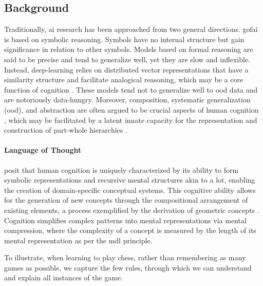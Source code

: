 \subsection{Background}
Traditionally, \acrfull{ai} research has been approached from two general directions. \acrfull{gofai} is based on symbolic reasoning. Symbols have no internal structure but gain significance in relation to other symbols. Models based on formal reasoning are said to be precise and tend to generalize well, yet they are slow and inflexible. Instead, deep-learning relies on distributed vector representations that have a similarity structure and facilitate analogical reasoning, which may be a core function of cognition \cite{bengio2021deep,hofstadter2013surfaces}. These models tend not to generalize well to \acrfull{ood} data and are notoriously data-hungry.
Moreover, composition, systematic generalization (\acrshort{ood}), and abstraction are often argued to be crucial aspects of human cognition \cite{cholletMeasureIntelligence2019, lecun2022path,Fodor_Pylyshyn_1988, hofstadter2013surfaces, boicho2001analogical}, which may be facilitated by a latent innate capacity for the representation and construction of part-whole hierarchies 
\cite{berwickPovertyStimulusRevisited2011,fristonWorldModelLearning2021,hintonHowRepresentPartwhole2021,martinsHowChildrenPerceive2014,raussWhatBottomUpWhat2013,schwartzBehavioralNeuralConstraints2017}.

\paragraph*{Language of Thought}\label{subsubsec:pplot}
\citet{dehaeneSymbolsMentalPrograms2022} posit that human cognition is uniquely characterized by its ability to form symbolic representations and recursive mental structures akin to a \acrfull{lot}, enabling the creation of domain-specific conceptual systems. This cognitive ability allows for the generation of new concepts through the compositional arrangement of existing elements, a process exemplified by the derivation of geometric concepts \cite{alroumiMentalCompressionSpatial2021}. Cognition simplifies complex patterns into mental representations via mental compression, where the complexity of a concept is measured by the length of its mental representation as per the \acrfull{mdl} principle. 

To illustrate, when learning to play chess, rather than remembering as many games as possible, we capture the few rules, through which we can understand and explain all instances of the game.

